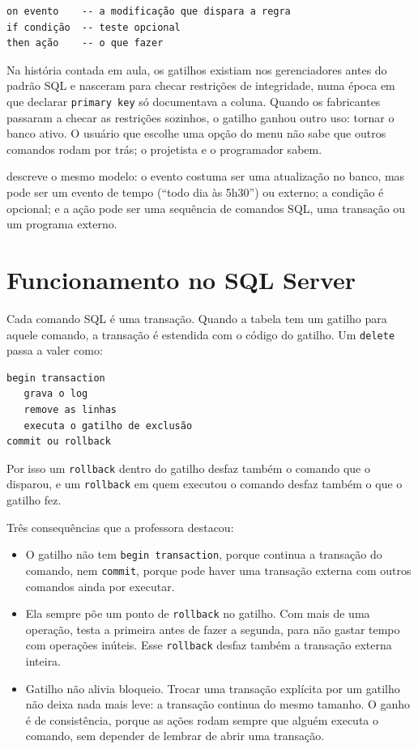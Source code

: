 \begin{lstlisting}[language={},numbers=none]
on evento    -- a modificação que dispara a regra
if condição  -- teste opcional
then ação    -- o que fazer
\end{lstlisting}

Na história contada em aula, os gatilhos
existiam nos gerenciadores antes do padrão SQL e nasceram para checar
restrições de integridade, numa época em que declarar \texttt{primary
key} só documentava a coluna. Quando os fabricantes passaram a checar as
restrições sozinhos, o gatilho ganhou outro uso: tornar o banco ativo. O
usuário que escolhe uma opção do menu não sabe que outros comandos rodam
por trás; o projetista e o programador sabem.

\textcite[seção 26.1]{Elmasri2011} descreve o mesmo modelo: o evento
costuma ser uma atualização no banco, mas pode ser um evento de tempo
(``todo dia às 5h30'') ou externo; a condição é opcional; e a ação pode
ser uma sequência de comandos SQL, uma transação ou um programa externo.

\section{Funcionamento no SQL Server}

Cada comando SQL é uma transação. Quando a tabela tem um gatilho para
aquele comando, a transação é estendida com o código do gatilho. Um
\texttt{delete} passa a valer como:

\begin{lstlisting}[language={},numbers=none]
begin transaction
   grava o log
   remove as linhas
   executa o gatilho de exclusão
commit ou rollback
\end{lstlisting}

Por isso um \texttt{rollback} dentro do gatilho desfaz também o comando
que o disparou, e um \texttt{rollback} em quem executou o comando desfaz
também o que o gatilho fez.

Três consequências que a professora destacou:

\begin{itemize}
	\item O gatilho não tem \texttt{begin transaction}, porque continua a
	transação do comando, nem \texttt{commit}, porque pode haver uma
	transação externa com outros comandos ainda por executar.
	\item Ela sempre põe um ponto de \texttt{rollback} no gatilho. Com
	mais de uma operação, testa a primeira antes de fazer a segunda, para
	não gastar tempo com operações inúteis. Esse \texttt{rollback} desfaz
	também a transação externa inteira.
	\item Gatilho não alivia bloqueio. Trocar uma transação explícita por
	um gatilho não deixa nada mais leve: a transação continua do mesmo
	tamanho. O ganho é de consistência, porque as ações rodam sempre que
	alguém executa o comando, sem depender de lembrar de abrir uma
	transação.
\end{itemize}

